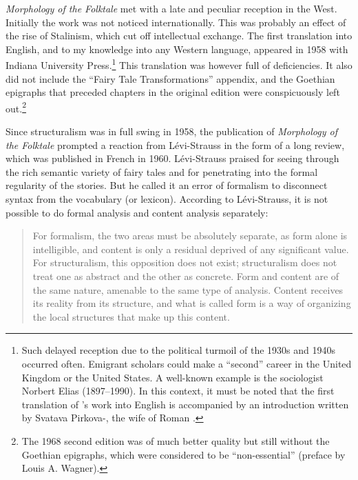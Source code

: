 \documentclass[output=paper]{langscibook}
\begin{document}
\emph{Morphology of the Folktale} met with a late and peculiar reception in the West. Initially the work was not noticed internationally. This was probably an effect of the rise of Stalinism, which cut off intellectual exchange. The first translation into English, and to my knowledge into any Western language, appeared in 1958 with Indiana University Press.\footnote{Such delayed reception due to the political turmoil of the 1930s and 1940s occurred often. Emigrant scholars could make a ``second'' career in the United Kingdom or the United States. A well-known example is the sociologist Norbert Elias (1897--1990). In this context, it must be noted that the first translation of {\Propp}'s work into English is accompanied by an introduction written by Svatava Pirkova-{\Jakobson}, the wife of Roman {\Jakobson}.} This translation was however full of deficiencies. It also did not include the ``Fairy Tale Transformations'' appendix, and the Goethian epigraphs that preceded chapters in the original edition were conspicuously left out.\footnote{The 1968 second edition was of much better quality but still without the Goethian epigraphs, which were considered to be ``non-essential'' (preface by Louis A. Wagner).} 

\largerpage
Since structuralism was in full swing in 1958, the publication of \emph{Morphology of the Folktale} prompted a reaction from Lévi-Strauss in the form of a long review, which was published in French in 1960. Lévi-Strauss praised {\Propp} for seeing through the rich semantic variety of fairy tales and for penetrating into the formal regularity of the stories. But he called it an error of formalism to disconnect syntax from the vocabulary (or lexicon). According to Lévi-Strauss, it is not possible to do formal analysis and content analysis separately: 

\begin{quotation}
For formalism, the two areas must be absolutely separate, as form alone is intelligible, and content is only a residual deprived of any significant value. For structuralism, this opposition does not exist; structuralism does not treat one as abstract and the other as concrete. Form and content are of the same nature, amenable to the same type of analysis. Content receives its reality from its structure, and what is called form is a way of organizing the local structures that make up this content. \citep[179]{Levi-Strauss1984}
\end{quotation}
\end{document}
